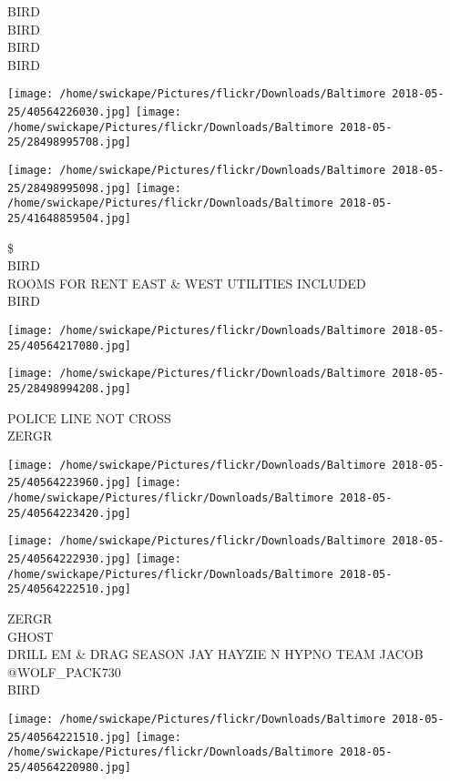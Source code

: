 \documentclass[10pt,letterpaper]{article}
\begin{document}
BIRD\\
BIRD\\
BIRD\\
BIRD\\
\pagebreak

\texttt{[image: /home/swickape/Pictures/flickr/Downloads/Baltimore 2018-05-25/40564226030.jpg]}
\texttt{[image: /home/swickape/Pictures/flickr/Downloads/Baltimore 2018-05-25/28498995708.jpg]}

\texttt{[image: /home/swickape/Pictures/flickr/Downloads/Baltimore 2018-05-25/28498995098.jpg]}
\texttt{[image: /home/swickape/Pictures/flickr/Downloads/Baltimore 2018-05-25/41648859504.jpg]}

\$\\
BIRD\\
ROOMS FOR RENT EAST \& WEST UTILITIES INCLUDED\\
BIRD\\
\pagebreak

\texttt{[image: /home/swickape/Pictures/flickr/Downloads/Baltimore 2018-05-25/40564217080.jpg]}

\vspace{0.25in}
\texttt{[image: /home/swickape/Pictures/flickr/Downloads/Baltimore 2018-05-25/28498994208.jpg]}

POLICE LINE NOT CROSS\\
ZERGR\\
\pagebreak

\texttt{[image: /home/swickape/Pictures/flickr/Downloads/Baltimore 2018-05-25/40564223960.jpg]}
\texttt{[image: /home/swickape/Pictures/flickr/Downloads/Baltimore 2018-05-25/40564223420.jpg]}

\texttt{[image: /home/swickape/Pictures/flickr/Downloads/Baltimore 2018-05-25/40564222930.jpg]}
\texttt{[image: /home/swickape/Pictures/flickr/Downloads/Baltimore 2018-05-25/40564222510.jpg]}

ZERGR\\
GHOST\\
DRILL EM \& DRAG SEASON JAY HAYZIE N HYPNO TEAM JACOB @WOLF\_PACK730\\
BIRD\\
\pagebreak

\texttt{[image: /home/swickape/Pictures/flickr/Downloads/Baltimore 2018-05-25/40564221510.jpg]}
\texttt{[image: /home/swickape/Pictures/flickr/Downloads/Baltimore 2018-05-25/40564220980.jpg]}
\end{document}
